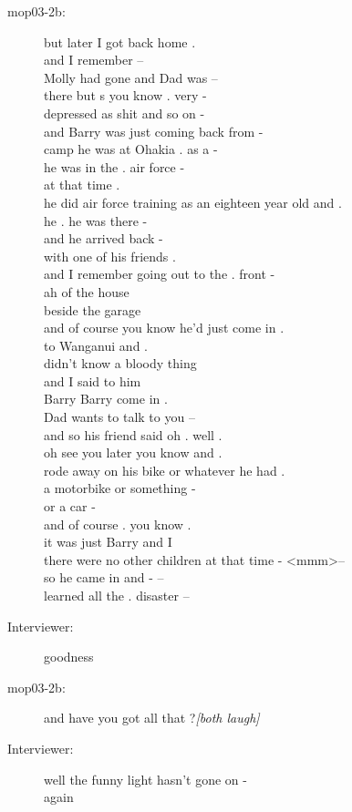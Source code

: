 \documentclass{article}
\newcommand{\turn}[2]{
\item[#1:] #2
}
\begin{document}
\begin{description}
\turn{mop03-2b}{but later I got back home .\\
and I remember --\\
Molly had gone and Dad was --\\
there but s you know . very -\\
depressed as shit and so on -\\
and Barry was just coming back from -\\
camp he was at Ohakia . as a -\\
he was in the . air force -\\
at that time .\\
he did air force training as an eighteen year old and .\\
he . he was there -\\
and he arrived back -\\
with one of his friends .\\
and I remember going out to the . front -\\
ah of the house\\
beside the garage\\
and of course you know he'd just come in .\\
to Wanganui and .\\
didn't know a bloody thing\\
and I said to him\\
Barry Barry come in .\\
Dad wants to talk to you --\\
and so his friend said oh . well .\\
oh see you later you know and .\\
rode away on his bike or whatever he had .\\
a motorbike or something -\\
or a car -\\
and of course . you know .\\
it was just Barry and I\\
there were no other children at that time - \textless mmm\textgreater  --\\
so he came in and - --\\
learned all the . disaster --}

\turn{Interviewer}{goodness}

\turn{mop03-2b}{and have you got all that ?\textit{[both laugh]} }

\turn{Interviewer}{well the funny light hasn't gone on -\\
again}


\end{description}
\end{document}
